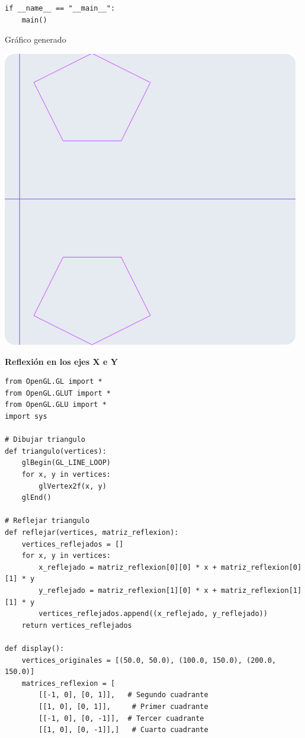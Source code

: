 \documentclass[a4paper]{article}
\begin{document}
{\begin{center}
\begin{mycodebox}
\begin{lstlisting}
if __name__ == "__main__":
    main()
\end{lstlisting}
\end{mycodebox}
\end{center}
Gráfico generado\\
\begin{center}
\includegraphics[width=13cm]{src/5.png}
\end{center}
\newpage
\Large{\textbf{Reflexión en los ejes X e Y}}\\[-0.4cm]
\begin{center}
\begin{mycodebox}
\begin{lstlisting}
from OpenGL.GL import *
from OpenGL.GLUT import *
from OpenGL.GLU import *
import sys

# Dibujar triangulo
def triangulo(vertices):
    glBegin(GL_LINE_LOOP)
    for x, y in vertices:
        glVertex2f(x, y)
    glEnd()

# Reflejar triangulo
def reflejar(vertices, matriz_reflexion):
    vertices_reflejados = []
    for x, y in vertices:
        x_reflejado = matriz_reflexion[0][0] * x + matriz_reflexion[0][1] * y
        y_reflejado = matriz_reflexion[1][0] * x + matriz_reflexion[1][1] * y
        vertices_reflejados.append((x_reflejado, y_reflejado))
    return vertices_reflejados

def display():
    vertices_originales = [(50.0, 50.0), (100.0, 150.0), (200.0, 150.0)]
    matrices_reflexion = [
        [[-1, 0], [0, 1]],   # Segundo cuadrante 
        [[1, 0], [0, 1]],     # Primer cuadrante 
        [[-1, 0], [0, -1]],  # Tercer cuadrante 
        [[1, 0], [0, -1]],]   # Cuarto cuadrante 
\end{lstlisting}
\end{mycodebox}
\end{center}

}
\end{document}

